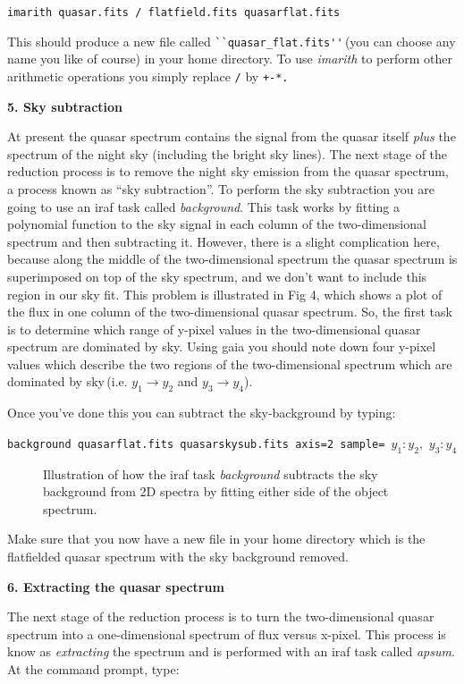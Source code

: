 {\tt imarith quasar.fits \verb,/, flatfield.fits quasarflat.fits}

This should produce a new file called \verb,``quasar_flat.fits'',\,(you can choose any name you like of course) in your home directory. To use {\it imarith} to perform other arithmetic operations you simply replace \verb,/, by \verb,+-*.,

{\large {\bf 5. Sky subtraction}}

At present the quasar spectrum contains the signal from the quasar itself {\it plus} the spectrum of the night sky (including the bright sky lines). The next stage of the reduction process is to remove the night sky emission from the quasar spectrum, a process known as ``sky subtraction''. To perform the sky subtraction you are going to use an {\sc iraf} task called {\it background}. This task works by fitting a polynomial function to the sky signal in each column of the two-dimensional spectrum and then subtracting it. However, there is a slight complication here, because along the middle of the two-dimensional spectrum the quasar spectrum is superimposed on top of the sky spectrum, and we don't want to include this region in our sky fit. This problem is illustrated in Fig 4, which shows a plot of the flux in one column of the two-dimensional quasar spectrum. So, the first task is to determine which range of y-pixel values in the two-dimensional quasar spectrum are dominated by sky. Using {\sc gaia} you should note down four y-pixel values which describe the two regions of the two-dimensional spectrum which are dominated by sky\,(i.e. $y_1 \rightarrow y_2$ and $y_3 \rightarrow y_4$).

Once you've done this you can subtract the sky-background by typing:

{\tt background quasarflat.fits quasarskysub.fits axis=2 sample= }$y_1:y_2,$ $y_3:y_4$

\begin{figure}
\centerline{}
\caption{Illustration of how the {\sc iraf} task {\it background} subtracts the sky background from 2D spectra by fitting either side of the object spectrum.}
\end{figure}

Make sure that you now have a new file in your home directory which is the flatfielded quasar spectrum with the sky background removed.

{\large {\bf 6. Extracting the quasar spectrum }}

The next stage of the reduction process is to turn the two-dimensional quasar spectrum into a one-dimensional spectrum of flux versus x-pixel. This process is know as {\it extracting} the spectrum and is performed with an {\sc iraf} task called {\it apsum}. At the command prompt, type:

